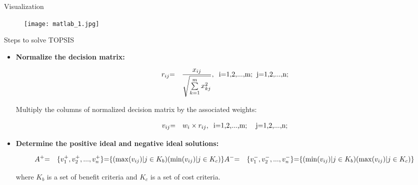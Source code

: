 \documentclass[serif, aspectratio=169]{beamer}
\newtheorem{thm co}{Theorem contd...}
\begin{document}
\begin{frame}{Visualization}
    \begin{figure}
        \centering
        \texttt{[image: matlab\_1.jpg]}

    \end{figure}
\end{frame}

\begin{frame}{Steps to solve TOPSIS}
\begin{itemize}
    \item \textbf{Normalize the decision matrix:}
     \vspace{-5mm}
    \begin{center}
\begin{eqnarray*}
    r_{ij}&\text{=}&\frac{x_{ij}}{\sqrt{\sum\limits^{m}_{k\text{=}1}x^{2}_{kj}}},
    \hspace{2mm}\text{i=1,2,...,m;} \hspace{2mm} \text{j=1,2,...,n;}
 \end{eqnarray*}   
    \end{center}
\hspace{1em}Multiply the columns of normalized decision matrix by the associated weights:
\vspace{-1cm}
\begin{center}
\begin{eqnarray*}
v_{ij}&\text{=}& w_{i} \times  r_{ij},\hspace{2mm}\text{i=1,2,...,m; \hspace{2mm} j=1,2,...,n;}
\end{eqnarray*}
\end{center}

\item \textbf{Determine the positive ideal and negative ideal solutions:} 
\vspace{-1.5cm}
\begin{center}
\begin{eqnarray*}

    A^{\text{+}}&\text{=}& \{v^{\text+}_{1}, v^{\text+}_{2},...,v^{\text+}_{n}\} \text= \{(\max(v_{ij})|j\in K_{b}) (\min(v_{ij})|j \in K_{c})\} 

    A^{-} &\text{=}& \{v^{-}_{1}, v^{-}_{2},...,v^{-}_{n}\} \text= \{(\min(v_{ij})|j\in K_{b}) (\max(v_{ij})|j \in K_{c})\} 
     
\end{eqnarray*} 
\end{center}
\vspace{-1.5cm}
\hspace{1em}where $K_{b}$ is a set of benefit criteria and $K_{c}$ is a set of cost criteria.
\end{itemize}
\end{frame}
\end{document}
